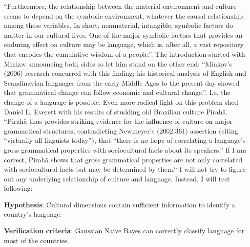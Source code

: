 \documentclass[a4paper,10pt]{article}
\begin{document}
``Furthermore, the relationship between the material environment and culture seems to depend on the symbolic environment, whatever the causal relationship among these variables. In short, nonmaterial, intangible, symbolic factors do matter in our cultural lives. One of the major symbolic factors that provides an enduring effect on culture may be language, which is, after all, a vast repository that encodes the cumulative wisdom of a people.''\cite{kashima2003}.
The introduction started with Minkov announcing both sides so let him stand on the other end: ``Minkov’s (2006) research concurred with this finding; his historical analysis of English and Scandinavian languages from the early Middle Ages to the present day showed that grammatical change can follow economic and cultural change.''\cite{minkov2013}.
I.e. the change of a language is possible.
Even more radical light on this problem shed Daniel L. Everett with his results of studding old Brazilian culture Pirah\~{a}.
``Pirah\~{a} thus provides striking evidence for the influence of culture on major grammatical structures, contradicting Newmeyer’s (2002:361) assertion (citing “virtually all linguists today”), that “there is no hope of correlating a language’s gross grammatical properties with sociocultural facts about its speakers.” If I am correct, Pirah\~{a} shows that gross grammatical properties are not only correlated with sociocultural facts but may be determined by them.``
I will not try to figure out any underlying relationship of culture and language.
Instead, I will test following:

\noindent\textbf{Hypothesis}: Cultural dimensions contain sufficient information to identify a country's language.

\noindent\textbf{Verification criteria}: Gaussian Naive Bayes can correctly classify language for most of the countries.
\end{document}
